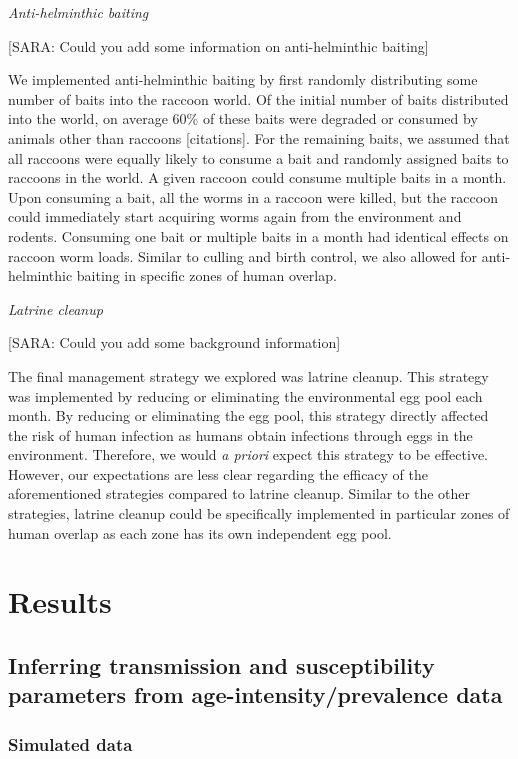 \documentclass[11pt]{article}
\begin{document}
\bigskip
\noindent
\emph{Anti-helminthic baiting}

[SARA: Could you add some information on anti-helminthic baiting]

We implemented anti-helminthic baiting by first randomly distributing
some number of baits into the raccoon world. Of the initial number of
baits distributed into the world, on average 60\% of these
baits were degraded or consumed by animals other than raccoons [citations]. For the
remaining baits, we assumed that all raccoons were equally likely to
consume a bait and randomly assigned baits to raccoons in the world. A
given raccoon could consume multiple baits in a month. Upon consuming a
bait, all the worms in a raccoon were killed, but the raccoon could
immediately start acquiring worms again from the environment and
rodents. Consuming one bait or multiple baits in a month had identical
effects on raccoon worm loads. Similar to culling and birth control, we
also allowed for anti-helminthic baiting in specific zones of human
overlap.

\bigskip
\noindent
\emph{Latrine cleanup}

[SARA: Could you add some background information]

The final management strategy we explored was latrine cleanup. This strategy was implemented by reducing or
eliminating the environmental egg pool each month.  By reducing or eliminating the egg pool, this strategy directly affected the risk of human infection as humans obtain infections through eggs in the environment.  Therefore, we would \emph{a priori} expect this strategy to be effective.  However, our expectations are less clear regarding the efficacy of the aforementioned strategies compared to latrine cleanup. Similar to the other strategies, latrine cleanup could be specifically implemented in particular zones of human overlap as each zone has its own independent egg pool. 

\section{Results}

\subsection{Inferring transmission and susceptibility parameters from age-intensity/prevalence data}

\subsubsection{Simulated data}
\end{document}
